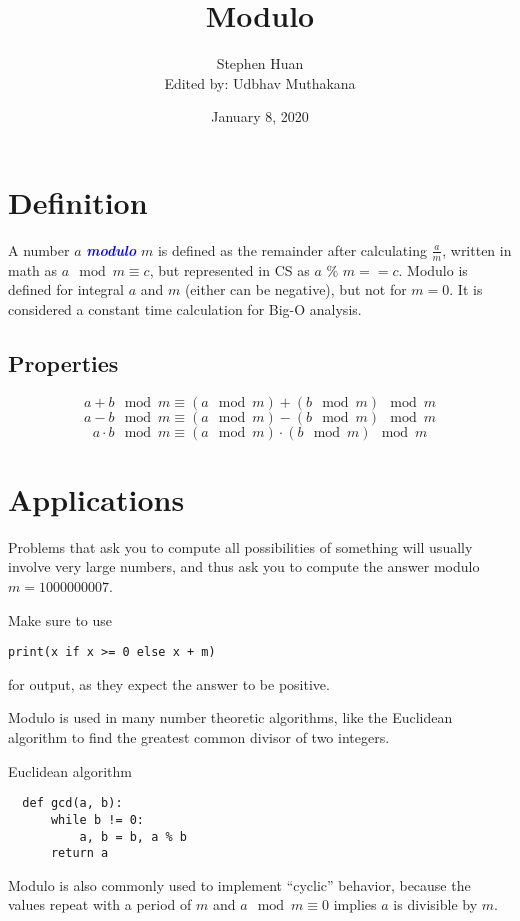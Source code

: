 \documentclass[11pt, oneside]{article}
\title{Modulo}
\author{Stephen Huan \\ Edited by: Udbhav Muthakana}
\date{January 8, 2020}
\newcommand{\emphasis}[1]{\textcolor{blue}{\textbf{\textit{#1}}}}
\begin{document}
\maketitle

\section{Definition}

A number \( a \) \emphasis{modulo} \( m \) is defined as the remainder after calculating \( \frac{a}{m} \),
written in math as \( a \mod m \equiv c \), but represented in CS as \( a \) \(\%\) \( m == c \).
Modulo is defined for integral \( a \) and \( m \) (either can be negative), but not for \( m = 0 \).
It is considered a constant time calculation for Big-O analysis.

\subsection{Properties}

\[ a + b \mod m \equiv (a \mod m) + (b \mod m) \mod m \]
\[ a - b \mod m \equiv (a \mod m) - (b \mod m) \mod m \]
\[ a \cdot b \mod m \equiv (a \mod m) \cdot (b \mod m) \mod m \]

\section{Applications}

Problems that ask you to compute all possibilities of something will usually involve very large numbers,
and thus ask you to compute the answer modulo \( m = 1000000007 \).

\noindent
Make sure to use
\begin{verbatim}
print(x if x >= 0 else x + m)
\end{verbatim}
for output, as they expect the answer to be positive.

Modulo is used in many number theoretic algorithms, like the Euclidean algorithm to find the greatest common divisor of two integers.

\begin{algorithm}
  \caption{Euclidean algorithm}
  \begin{verbatim}
  def gcd(a, b):
      while b != 0:
          a, b = b, a % b
      return a
  \end{verbatim}
\end{algorithm}

Modulo is also commonly used to implement ``cyclic'' behavior, because the values repeat with a period
of \( m \) and \( a \mod m \equiv 0 \) implies \( a \) is divisible by \( m \).
\end{document}
